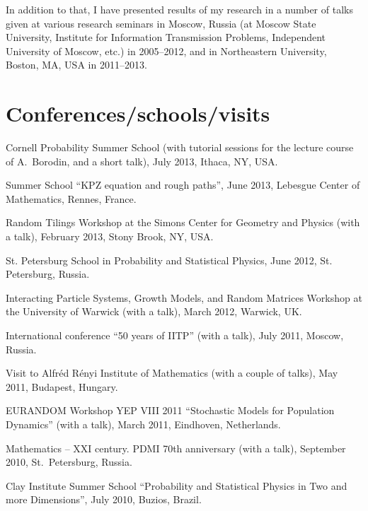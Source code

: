 \documentclass[letterpaper,11pt]{article}
\begin{document}
In addition to that, I have presented results of my research in a number of talks given at various research seminars in Moscow, Russia (at Moscow State University, Institute for Information Transmission Problems, Independent University of Moscow, etc.) in 2005--2012, and in Northeastern University, Boston, MA, USA in 2011--2013.

\section*{Conferences/schools/visits}

\begin{etaremune}

\item
Cornell Probability Summer School (with tutorial sessions for the lecture course of 
A.~Borodin, and a short talk), July 2013, Ithaca, NY, USA.

\item Summer School ``KPZ equation and rough paths'', 
June 2013, 
Lebesgue Center of Mathematics, Rennes, France.

\item 
Random Tilings Workshop at the 
Simons Center for Geometry and Physics (with a talk),
February 2013, Stony Brook, NY, USA.


\item St. Petersburg School in Probability and Statistical Physics, June 2012, St. Petersburg, Russia.

\item 
Interacting Particle Systems, Growth Models, and Random Matrices Workshop at the University of Warwick (with a talk), March 2012, Warwick, UK.

\item International conference ``50 years of IITP'' (with a talk), July 2011, Moscow, Russia.
  
\item Visit to Alfr\'ed R\'enyi Institute of Mathematics (with a couple of talks), May 2011, Budapest, Hungary.

\item EURANDOM Workshop YEP VIII 2011 ``Stochastic Models for Population Dynamics'' (with a talk), March 2011, Eindhoven, Netherlands.

\item Mathematics -- XXI century. PDMI 70th anniversary (with a talk), September 2010, St.~Petersburg, Russia.

\item Clay Institute Summer School ``Probability and Statistical Physics in Two and more Dimensions'', July 2010, Buzios, Brazil. 


\end{etaremune}
\end{document}
